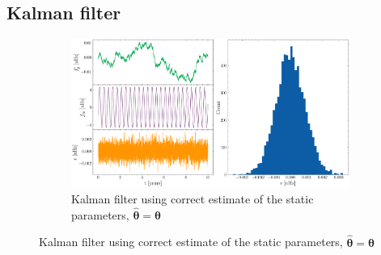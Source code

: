 \documentclass[fleqn,usenatbib,useAMS]{mnras}
\begin{document}

\subsection{Kalman filter}\label{sec:kalman_filter}
\begin{figure}
	\begin{subfigure}[b]{1\textwidth}
		\includegraphics[width=\textwidth]{images/Kalman_example_true_params}
		\caption{Kalman filter using correct estimate of the static parameters, $\hat{\boldsymbol{\theta}} = \boldsymbol{\theta}$ }
		\label{fig:6MB_BFS}
	\end{subfigure} \newline 


\end{figure}
\end{document}
